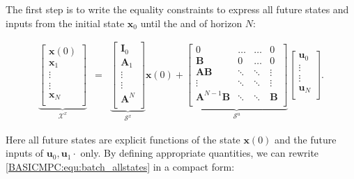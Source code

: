     The first step is to write the equality constraints to express all future states and inputs from the initial state $\textbf{x}_0$ until the and of horizon $N$:

    \begin{equation}
        \begin{array}{rcl}
        \underbrace{
        \begin{bmatrix}
        \textbf{x}(0)\\
        \textbf{x}_1\\
        \vdots\\
        \vdots\\
        \textbf{x}_N\\
        \end{bmatrix}}_{\mathcal{X}^x}
        &=&
        \underbrace{
        \begin{bmatrix}
        \textbf{I}_0\\
        \textbf{A}_1\\
        \vdots\\
        \vdots\\
        \textbf{A}^N\\
        \end{bmatrix}}_{\mathcal{S}^x}\textbf{x}(0)+
        \underbrace{
        \begin{bmatrix}
        0& \dots& \dots& 0\\
        \textbf{B}& 0& \dots& 0\\
        \textbf{AB}& \ddots& \ddots& \vdots\\
        \vdots& \ddots& \ddots& \vdots\\
        \textbf{A}^{N-1}\textbf{B}& \ddots& \ddots& \textbf{B}\\
        \end{bmatrix}}_{\mathcal{S}^u}
        \begin{bmatrix}
        \textbf{u}_0\\
        \vdots\\
        \vdots\\
        \textbf{u}_N\\
        \end{bmatrix}.

		\end{array}
        \label{BASICMPC:equ:batch_allstates}
    \end{equation}

    Here all future states are explicit functions of the state $\textbf{x}(0)$ and the future inputs of $\textbf{u}_0,\textbf{u}_1\cdot$ only. By defining appropriate quantities, we can rewrite \ref{BASICMPC:equ:batch_allstates} in a compact form:

